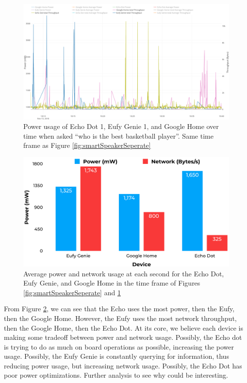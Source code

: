 \begin{figure}[H]
  \centering
  \includegraphics[width=1\textwidth]{figures/smartSpeakerNetworkSeperate.png}
  \caption{Power usage of Echo Dot 1, Eufy Genie 1, and Google Home over time when asked ``who is the best basketball player''. Same time frame as Figure \ref{fig:smartSpeakerSeperate}}
  \label{fig:smartSpeakerNetworkSeperate}
\end{figure}

\begin{figure}[H]
    \centering
    \includegraphics[width=1\textwidth]{figures/smartSpeakerComparison.png}
    \caption{Average power and network usage at each second for the Echo Dot, Eufy Genie, and Google Home in the time frame of Figures \ref{fig:smartSpeakerSeperate} and \ref{fig:smartSpeakerNetworkSeperate}}
    \label{fig:smartSpeakerComparison}
  \end{figure}

From Figure \ref{fig:smartSpeakerComparison}, we can see that the Echo uses the most power, then the Eufy, then the Google Home. However, the Eufy uses the most network throughput, then the Google Home, then the Echo Dot. At its core, we believe each device is making some tradeoff between power and network usage. Possibly, the Echo dot is trying to do as much on board operations as possible, increasing the power usage. Possibly, the Eufy Genie is constantly querying for information, thus reducing power usage, but increasing network usage. Possibly, the Echo Dot has poor power optimizations. Further analysis to see why could be interesting.

